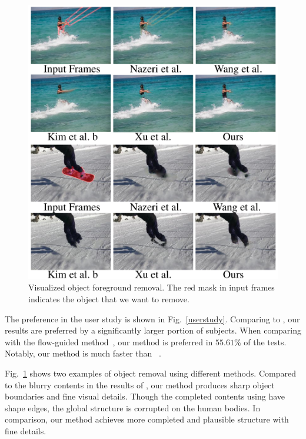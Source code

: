 \begin{figure}[!h]
	\centering
	\includegraphics[width=1.0\columnwidth]{vis_forg} %
	\caption{Visualized object foreground removal. The red mask in input frames indicates the object that we want to remove.}
	\label{vis_forg}
\end{figure}
The preference in the user study is shown in Fig.~\ref{userstudy}. 
Comparing to \cite{nazeri2019edgeconnect,wang2019video,Kim_2019_CVPR1}, our results are preferred by a significantly larger portion of subjects.
%
When comparing with the flow-guided method~\cite{Xu_2019_CVPR}, our method is preferred in $55.61\%$ of the tests. 
Notably, our method is much faster than ~\cite{Xu_2019_CVPR}.

%
Fig.~\ref{vis_forg} shows two examples of object removal using different methods. 
Compared to the blurry contents in the results of \cite{nazeri2019edgeconnect,wang2019video,Kim_2019_CVPR1}, our method produces sharp object boundaries and fine visual details. 
Though the completed contents using \cite{Xu_2019_CVPR} have shape edges, the global structure is corrupted on the human bodies. In comparison, our method achieves more completed and plausible structure with fine details.



